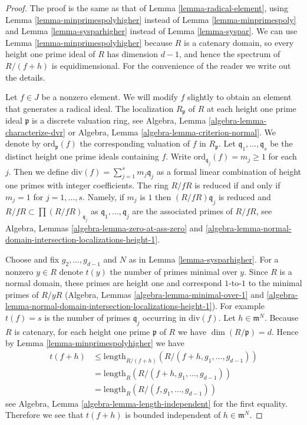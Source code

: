 \documentclass[10pt,a4paper]{amsart}
\theoremstyle{plain}
\theoremstyle{definition}
\theoremstyle{remark}
\numberwithin{equation}{subsection}
\begin{document}
\begin{proof}
The proof is the same as that of
Lemma \ref{lemma-radical-element},
using Lemma \ref{lemma-minprimespolyhigher} instead of
Lemma \ref{lemma-minprimespoly} and
Lemma \ref{lemma-sysparhigher} instead of
Lemma \ref{lemma-syspar}.
We can use Lemma \ref{lemma-minprimespolyhigher} because $R$
is a catenary domain, so every height one prime ideal of $R$
has dimension $d - 1$, and hence the spectrum of $R/(f + h)$ is
equidimensional. For the convenience of the reader we write out
the details.

\medskip\noindent
Let $f \in J$ be a nonzero element.
We will modify $f$ slightly to obtain an element that generates a radical ideal.
The localization $R_\mathfrak p$ of $R$ at each height one prime
ideal $\mathfrak p$ is a discrete valuation ring, see
Algebra, Lemma \ref{algebra-lemma-characterize-dvr} or
Algebra, Lemma \ref{algebra-lemma-criterion-normal}.
We denote by $\text{ord}_\mathfrak p(f)$ the corresponding
valuation of $f$ in $R_{\mathfrak p}$. Let
$\mathfrak q_1, \ldots, \mathfrak q_s$
be the distinct height one prime ideals containing $f$.
Write $\text{ord}_{\mathfrak q_j}(f) = m_j \geq 1$
for each $j$. Then we define
$\text{div}(f) = \sum_{j = 1}^s m_j\mathfrak q_j$
as a formal linear combination of
height one primes with integer coefficients.
The ring $R/fR$ is reduced if and only if
$m_j = 1$ for $j = 1, \ldots, s$. Namely, if $m_j$ is $1$ then
$(R/fR)\mathfrak q_j$ is reduced and
$R/fR \subset \prod (R/fR)_{\mathfrak q_j}$ as
$\mathfrak q_1, \ldots, \mathfrak q_j$ are the associated primes
of $R/fR$, see Algebra, Lemmas
\ref{algebra-lemma-zero-at-ass-zero} and
\ref{algebra-lemma-normal-domain-intersection-localizations-height-1}.

\medskip\noindent
Choose and fix $g_2, \ldots, g_{d - 1}$ and $N$ as in
Lemma \ref{lemma-sysparhigher}.
For a nonzero $y \in R$ denote $t(y)$ the number of primes minimal over $y$.
Since $R$ is a normal domain, these primes
are height one and correspond $1$-to-$1$ to the minimal primes of
$R/yR$ (Algebra, Lemmas \ref{algebra-lemma-minimal-over-1} and
\ref{algebra-lemma-normal-domain-intersection-localizations-height-1}).
For example $t(f) = s$ is the number
of primes $\mathfrak q_j$ occurring in $\text{div}(f)$.
Let $h \in \mathfrak m^N$. Because $R$ is catenary, for each
height one prime $\mathfrak p$ of $R$ we have
$\dim(R/\mathfrak p) = d$. Hence by
Lemma \ref{lemma-minprimespolyhigher}
we have
\begin{align*}
t(f + h) & \leq \text{length}_{R/(f + h)}(R/(f + h, g_1, \ldots, g_{d - 1})) \\
& = \text{length}_R(R/(f + h, g_1, \ldots, g_{d - 1})) \\
& = \text{length}_R(R/(f, g_1, \ldots, g_{d - 1}))
\end{align*}
see Algebra, Lemma \ref{algebra-lemma-length-independent}
for the first equality.
Therefore we see that $t(f + h)$ is bounded independent of
$h \in \mathfrak m^N$.


\end{proof}
\end{document}
